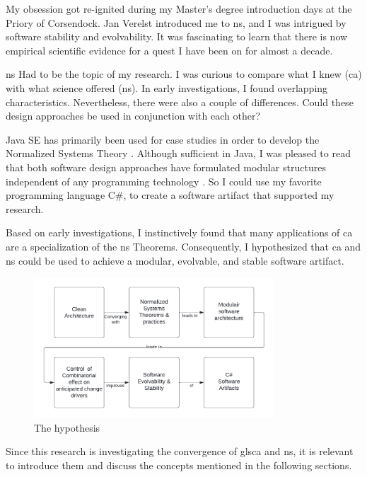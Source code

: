 My obsession got re-ignited during my Master's degree introduction days at the Priory of
Corsendock. Jan Verelst introduced me to \gls{ns}, and I was intrigued by software
stability and evolvability. It was fascinating to learn that there is now empirical
scientific evidence for a quest I have been on for almost a decade. 

\gls{ns} Had to be the topic of my research. I was curious to compare what I knew
(\gls{ca}) with what science offered (\gls{ns}). In early investigations, I found
overlapping characteristics. Nevertheless, there were also a couple of differences. Could
these design approaches be used in conjunction with each other?

Java SE has primarily been used for case studies in order to develop the Normalized
Systems Theory \parencite{oorts_building_2014, de_bruyn_enabling_2018}. Although
sufficient in Java, I was pleased to read that both software design approaches have
formulated modular structures independent of any programming technology
\parencite{mannaert_normalized_2009,robert_c_martin_clean_2018}. So I could use my
favorite programming language C\#, to create a software artifact that supported my
research. 

Based on early investigations, I instinctively found that many applications of \gls{ca}
are a specialization of the \gls{ns} Theorems. Consequently, I hypothesized that \gls{ca}
and \gls{ns} could be used to achieve a modular, evolvable, and stable software artifact.

\begin{figure}[H]
    \centering
    \includegraphics[width=0.8\textwidth]{figures/hypothesis.pdf}
    \caption[The hypothesis]{The hypothesis}
    \label{fig_hypothesis}
\end{figure}

Since this research is investigating the convergence of gls{ca} and \gls{ns}, it is
relevant to introduce them and discuss the concepts mentioned in the following sections.



